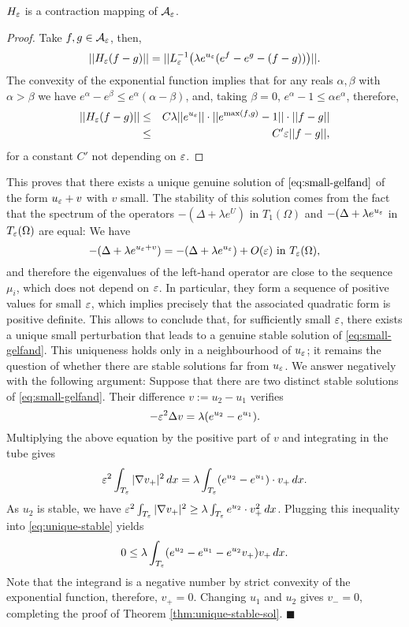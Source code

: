 \begin{lemma}
    $H_\varepsilon$ is a contraction mapping of $\mathcal{A}_\varepsilon$.
\end{lemma}
\begin{proof}
    Take $f,g\in \mathcal{A}_\varepsilon$, then,
    $$||H_\varepsilon(f-g)||=||L_\varepsilon^{-1}\big(\lambda e^{u_\varepsilon}(e^f-e^g -
    (f-g))\big)||.  $$
    The convexity of the exponential function implies that for any reals
    $\alpha,\beta$ with $\alpha>\beta$ we have $e^{\alpha}-e^{\beta}\leq
    e^{\alpha}(\alpha-\beta)$, and, taking $\beta=0$, $e^\alpha-1\leq \alpha e^\alpha$, therefore,
    \begin{eqnarray*}
        ||H_\varepsilon(f-g)||&\leq& C\lambda ||e^{u_\varepsilon}||\cdot ||e^{\max(f,g)}-1||\cdot
    ||f-g||\\
                      &\leq& C'\varepsilon||f-g||,
    \end{eqnarray*}
    for a constant $C'$ not depending on $\varepsilon$.
\end{proof}
This proves that there exists a
    unique genuine solution of $\ref{eq:small-gelfand}$ of the form $u_\varepsilon+v$
    with $v$ small. The stability of this solution comes from the fact that the
    spectrum of the operators $-(\Delta+\lambda e^U)$ in $T_1(\Omega)$ and
    $-(\Delta + \lambda e^{u_\varepsilon}$ in $T_\varepsilon(\Omega)$ are equal: We have
    $$-(\Delta + \lambda e^{u_\varepsilon+v})=-(\Delta + \lambda e^{u_\varepsilon})+O(\varepsilon)
    \mbox{ in } T_\varepsilon(\Omega),$$
    and therefore the eigenvalues of the left-hand operator are close to the
    sequence $\mu_i$, which does not depend on $\varepsilon$. In particular, they form
    a sequence of positive values for small $\varepsilon$, which implies precisely that
    the associated quadratic form is positive definite. This allows to conclude
    that, for sufficiently small $\varepsilon$, there exists a unique small perturbation
    that leads to a genuine stable solution of \ref{eq:small-gelfand}. This
    uniqueness holds only in a neighbourhood of $u_\varepsilon$; it remains the
    question of whether there are stable solutions far from $u_\varepsilon$. We answer
    negatively with the following argument: Suppose that there are two distinct
    stable solutions of \ref{eq:small-gelfand}. Their difference $v:=u_2-u_1$
    verifies
    $$-\varepsilon^2 \Delta v = \lambda(e^{u_2}-e^{u_1}).$$
    Multiplying the above equation by the positive part of $v$ and integrating
    in the tube gives
    \begin{equation}
        \label{eq:unique-stable}
        \varepsilon^2\int_{T_\varepsilon}|\nabla v_+|^2\,dx = \lambda
    \int_{T_\varepsilon}(e^{u_2}-e^{u_1})\cdot v_+\, dx.
\end{equation}
    As $u_2$ is stable, we have $\varepsilon^2\int_{T_\varepsilon}|\nabla v_+|^2\geq \lambda
    \int_{T_\varepsilon} e^{u_2}\cdot v_+^2\, dx$. Plugging this inequality into
    \ref{eq:unique-stable} yields
    $$
    0 \leq \lambda \int_{T_\varepsilon}(e^{u_2}-e^{u_1}-e^{u_2}v_+)v_+\, dx.
    $$
    Note that the integrand is a negative number by strict convexity of the
    exponential function, therefore, $v_+=0$. Changing $u_1$ and $u_2$ gives
    $v_-=0$, completing the proof of Theorem \ref{thm:unique-stable-sol}.
    \hfill $\blacksquare$
